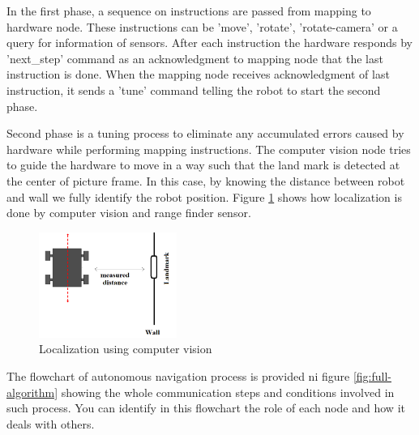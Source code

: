 \documentclass[12pt]{book}
\begin{document}
\noindent In the first phase, a sequence on instructions are passed from mapping to hardware node. These instructions can be 'move', 'rotate', 'rotate-camera' or a query for information of sensors. After each instruction the hardware responds by 'next\_step' command as an acknowledgment to mapping node that the last instruction is done. When the mapping node receives acknowledgment of last instruction, it sends a 'tune' command telling the robot to start the second phase. 

\noindent Second phase is a tuning process to eliminate any accumulated errors caused by hardware while performing mapping instructions. The computer vision node tries to guide the hardware to move in a way such that the land mark is detected at the center of picture frame. In this case, by knowing the distance between robot and wall we fully identify the robot position. Figure \ref{fig:localization} shows how localization is done by computer vision and range finder sensor.
\begin{figure}
	\centering
	\includegraphics[width =0.4\textwidth]{Fig/localization.png}
	\caption{Localization using computer vision}
	\label{fig:localization}
\end{figure}

\noindent The flowchart of autonomous navigation process is provided ni figure \ref{fig:full-algorithm} showing the whole communication steps and conditions involved in such process. You can identify in this flowchart the role of each node and how it deals with others.
\end{document}
